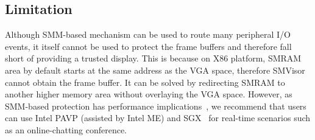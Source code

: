 \subsection{Limitation}
Although  SMM-based mechanism can be used to route many peripheral I/O events, it itself cannot be used to protect the frame buffers and therefore fall short of providing a trusted display. This is because on X86 platform, SMRAM area by default starts at the same address as the VGA space, therefore SMVisor cannot obtain the frame buffer. It can be solved by redirecting  SMRAM to another higher memory area without overlaying the VGA space. However, as  SMM-based protection has performance implications~\cite{DBLP:conf/iiswc/DelgadoK13}, we recommend that users can use Intel PAVP (assisted by Intel ME) and SGX~\cite{DBLP:conf/isca/HoekstraLPPC13} for real-time scenarios such as an online-chatting conference.


%

